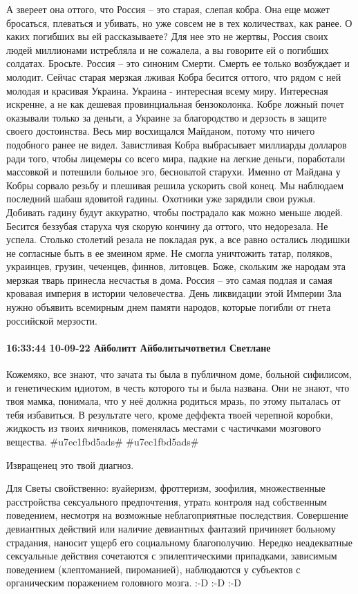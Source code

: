 А звереет она оттого, что Россия – это старая, слепая кобра. Она еще может бросаться, плеваться и убивать, но уже совсем не в тех количествах, как ранее.
О каких погибших вы ей рассказываете? Для нее это не жертвы, Россия своих людей миллионами истребляла и не сожалела, а вы говорите ей о погибших солдатах. Бросьте. Россия – это синоним Смерти. Смерть ее только возбуждает и молодит.
Сейчас старая мерзкая лживая Кобра бесится оттого, что рядом с ней молодая и красивая Украина. Украина - интересная всему миру. Интересная искренне, а не как дешевая провинциальная бензоколонка. Кобре ложный почет оказывали только за деньги, а Украине за благородство и дерзость в защите своего достоинства. Весь мир восхищался Майданом, потому что ничего подобного ранее не видел. Завистливая Кобра выбрасывает миллиарды долларов ради того, чтобы лицемеры со всего мира, падкие на легкие деньги, поработали массовкой и потешили больное эго, бесноватой старухи.
Именно от Майдана у Кобры сорвало резьбу и плешивая решила ускорить свой конец. Мы наблюдаем последний шабаш ядовитой гадины. Охотники уже зарядили свои ружья. Добивать гадину будут аккуратно, чтобы пострадало как можно меньше людей.
Бесится беззубая старуха чуя скорую кончину да оттого, что недорезала. Не успела. Столько столетий резала не покладая рук, а все равно остались людишки не согласные быть в ее змеином ярме. Не смогла уничтожить татар, поляков, украинцев, грузин, чеченцев, финнов, литовцев. Боже, скольким же народам эта мерзкая тварь принесла несчастья в дома.
Россия – это самая подлая и самая кровавая империя в истории человечества. День ликвидации этой Империи Зла нужно объявить всемирным днем памяти народов, которые погибли от гнета российской мерзости.

\paragraph{16:33:44 10-09-22 Айболитт Айболитычответил Светлане}

Кожемяко, все знают, что зачата ты была в публичном доме, больной сифилисом, и
генетическим идиотом, в честь которого ты и была названа. Они не знают, что
твоя мамка, понимала, что у неё должна родиться мразь, по этому пыталась от
тебя избавиться. В результате чего, кроме деффекта твоей черепной коробки,
жидкость из твоих яичников, поменялась местами с частичками мозгового вещества.
#u7ec1fbd5ads# #u7ec1fbd5ads#

Извращенец это твой диагноз.

Для Светы свойственно: вуайеризм, фроттеризм, зоофилия, множественные
расстройства сексуального предпочтения, утратa контроля над собственным
поведением, несмотря на возможные неблагоприятные последствия. Совершение
девиантных действий или наличие девиантных фантазий причиняет больному
страдания, наносит ущерб его социальному благополучию. Нередко неадекватные
сексуальные действия сочетаются с эпилептическими припадками, зависимым
поведением (клептоманией, пироманией), наблюдаются у субъектов с органическим
поражением головного мозга. :-D :-D :-D

